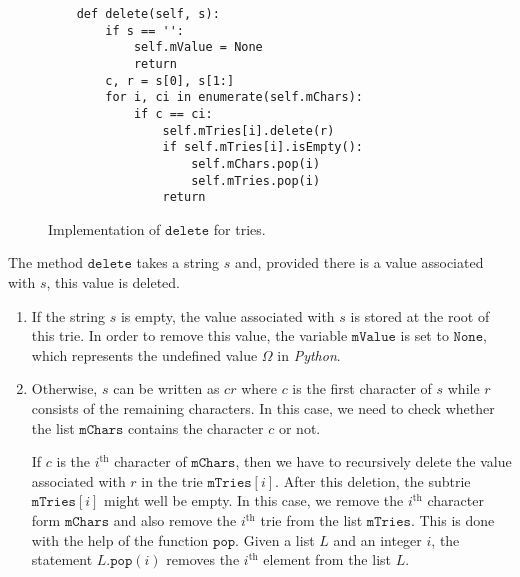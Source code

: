 \begin{figure}[!ht]
\centering
\begin{verbatim}
    def delete(self, s):
        if s == '':
            self.mValue = None
            return
        c, r = s[0], s[1:]
        for i, ci in enumerate(self.mChars):
            if c == ci:
                self.mTries[i].delete(r)
                if self.mTries[i].isEmpty():
                    self.mChars.pop(i)
                    self.mTries.pop(i)
                return
\end{verbatim}
\vspace*{-0.3cm}
\caption{Implementation of $\texttt{delete}$ for tries.}
\label{fig:trie.ipython-delete}
\end{figure}

The method $\texttt{delete}$ takes a string $s$ and, provided there is a value associated with $s$, this
value is deleted.
\begin{enumerate}
\item If the string $s$ is empty, the value associated with $s$ is stored at the root of this trie.
      In order to remove this value, the variable $\texttt{mValue}$ is set to $\texttt{None}$, which represents
      the undefined value $\Omega$ in \textsl{Python}.
\item Otherwise, $s$ can be written as $cr$ where $c$ is the first character of $s$ while $r$
      consists of the remaining characters.  In this case, we need to check whether the list
      $\texttt{mChars}$ contains the character $c$ or not.
 
      If $c$ is the $i^\textrm{th}$ character of $\texttt{mChars}$, then we have to recursively
      delete the value associated with $r$ in the trie $\texttt{mTries}[i]$.  
      After this deletion, the subtrie  $\texttt{mTries}[i]$ might well be empty.  In this case,
      we remove the $i^\textrm{th}$ character form $\texttt{mChars}$ and also remove the $i^\textrm{th}$ trie from the list
      $\texttt{mTries}$.  This is done with the help of the function $\texttt{pop}$.
      Given a list $L$ and an integer $i$, the statement $L.\texttt{pop}(i)$ removes the $i^\textrm{th}$ element from
      the list $L$.
\end{enumerate}

